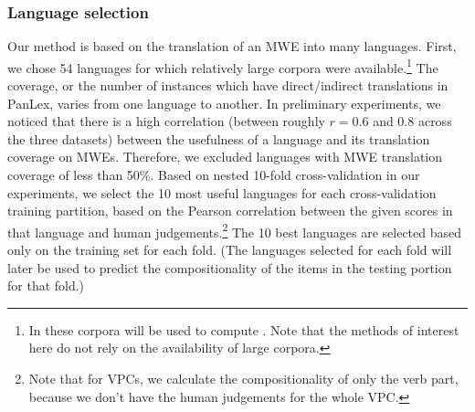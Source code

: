 \documentclass[output=paper,modfonts,nonflat]{langsci/langscibook}
\begin{document}




\subsubsection{Language selection\label{sec:ss-lang-selection}}

Our method is based on the translation of an MWE into many
languages. First, we chose 54 languages for which
relatively large corpora were available.\footnote{In
   these corpora will be used to compute
  . Note that the  methods of interest here do not rely on the
  availability of large corpora.} The coverage, or the number of
instances which have direct/indirect translations in PanLex, varies
from one language to another. In preliminary experiments, we noticed
that there is a high correlation (between roughly $r = 0.6$ and 0.8 across
the three datasets) between the usefulness of a language and its
translation coverage on MWEs. Therefore, we excluded languages with
MWE translation coverage of less than 50\%. Based on nested 10-fold
cross-validation in our experiments, we select the 10 most useful
languages for each cross-validation training partition, based on the
Pearson correlation between the given scores in that language and
human judgements.\footnote{Note that for VPCs, we calculate the
  compositionality of only the verb part, because we don't have the
  human judgements for the whole VPC.}  The 10 best languages are
selected based only on the training set for each fold. (The languages
selected for each fold will later be used to predict the
compositionality of the items in the testing portion for that fold.)
\end{document}
